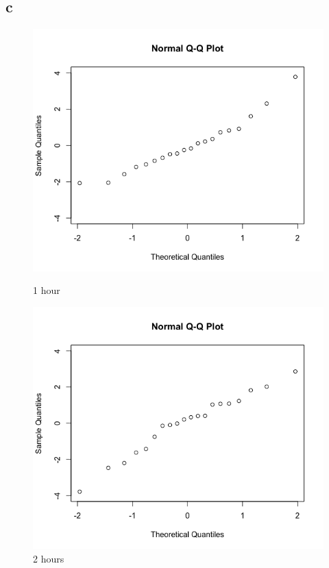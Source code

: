 \documentclass[11pt,letterpaper]{article}
\begin{document}
\subsection*{c}

\begin{figure}[!htb]
  \includegraphics[width=\linewidth]{lect-7-4-c-1.png}
  \caption{1 hour}
\endminipage\hfill
{}
  \includegraphics[width=\linewidth]{lect-7-4-c-2.png}
  \caption{2 hours}
\endminipage\hfill
{}%

\end{figure}
\end{document}
